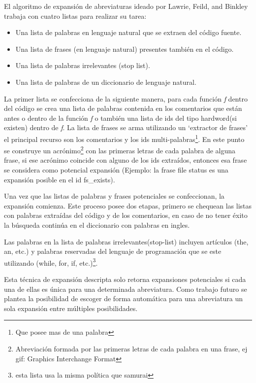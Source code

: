 \documentclass[12pt]{report}
\begin{document}
El algoritmo de expansión de abreviaturas ideado por Lawrie, Feild, and Binkley \cite{LFBEX07, EZH08} trabaja con cuatro listas para realizar su tarea:

\begin{itemize}
\itemsep0em%
\item Una lista de palabras en lenguaje natural que se extraen del código fuente.
\item Una lista de frases (en lenguaje natural) presentes también en el código.
\item Una lista de palabras irrelevantes (stop list).
\item Una lista de palabras de un diccionario de lenguaje natural.
\end{itemize}

La primer lista se confecciona de la siguiente manera, para cada función \textit{f} dentro del código se crea una lista de palabras contenida en los comentarios que están antes o dentro de la función \textit{f} o también una lista de ids del tipo hardword(si existen) dentro de \textit{f}. La lista de frases se arma utilizando un `extractor de frases' \cite{a} el principal recurso son los comentarios y los ids multi-palabras\footnote[1]{Que posee mas de una palabra}. En este punto se construye un acrónimo\footnote[2]{Abreviación formada por las primeras letras de cada palabra en una frase, ej gif: Graphics Interchange Format} con las primeras letras de cada palabra de alguna frase, si ese acrónimo coincide con alguno de los ids extraídos, entonces esa frase se considera como potencial expansión (Ejemplo: la frase \textsf{file status} es una expansión posible en el id \textsf{fs\_exists}).

Una vez que las listas de palabras y frases potenciales se confeccionan, la expansión comienza. Este proceso posee dos  etapas, primero se chequean las listas con palabras extraídas del código y de los comentarios, en caso de no tener éxito la búsqueda continúa en el diccionario con palabras en ingles.

Las palabras en la lista de palabras irrelevantes(stop-list) incluyen artículos (the, an, etc.) y palabras reservadas del lenguaje de programación que se este utilizando (\textsf{while, for, if,} etc.)\footnote[3]{esta lista usa la misma política que samurai}.


Esta técnica de expansión descripta solo retorna expansiones potenciales si cada una de ellas es única para una determinada abreviatura. Como trabajo futuro se plantea la posibilidad de escoger de forma automática para una abreviatura un sola expansión entre múltiples posibilidades\cite{LFBEX07,EZH08}.
\end{document}
